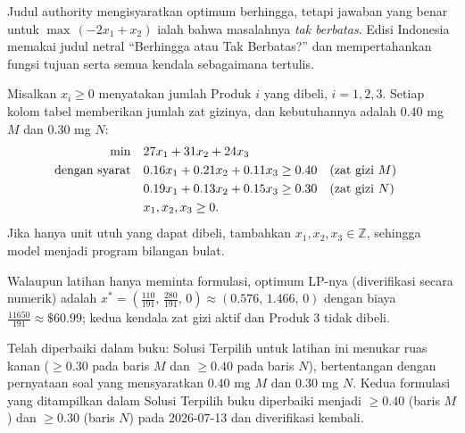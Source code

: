\begin{qaflag}
Judul authority mengisyaratkan optimum berhingga, tetapi jawaban yang benar untuk $\max\,(-2x_1+x_2)$ ialah bahwa masalahnya \emph{tak berbatas}. Edisi Indonesia memakai judul netral ``Berhingga atau Tak Berbatas?'' dan mempertahankan fungsi tujuan serta semua kendala sebagaimana tertulis.
\end{qaflag}

Misalkan $x_i \geq 0$ menyatakan jumlah Produk $i$ yang dibeli, $i = 1, 2, 3$. Setiap kolom tabel memberikan jumlah zat gizinya, dan kebutuhannya adalah $0.40$ mg $M$ dan $0.30$ mg $N$:
\begin{align*}
\min \quad & 27x_1 + 31x_2 + 24x_3 \\
\mbox{dengan syarat}\quad & 0.16x_1 + 0.21x_2 + 0.11x_3 \geq 0.40 && (\mbox{zat gizi } M)\\
& 0.19x_1 + 0.13x_2 + 0.15x_3 \geq 0.30 && (\mbox{zat gizi } N)\\
& x_1, x_2, x_3 \geq 0.
\end{align*}
Jika hanya unit utuh yang dapat dibeli, tambahkan $x_1, x_2, x_3 \in \mathbb{Z}$, sehingga model menjadi program bilangan bulat.

Walaupun latihan hanya meminta formulasi, optimum LP-nya (diverifikasi secara numerik) adalah $x^* = (\tfrac{110}{191},\, \tfrac{280}{191},\, 0) \approx (0.576,\, 1.466,\, 0)$ dengan biaya $\tfrac{11650}{191} \approx \$60.99$; kedua kendala zat gizi aktif dan Produk 3 tidak dibeli.

\begin{qaflag}
Telah diperbaiki dalam buku: Solusi Terpilih untuk latihan ini menukar ruas kanan ($\geq 0.30$ pada baris $M$ dan $\geq 0.40$ pada baris $N$), bertentangan dengan pernyataan soal yang mensyaratkan $0.40$ mg $M$ dan $0.30$ mg $N$. Kedua formulasi yang ditampilkan dalam Solusi Terpilih buku diperbaiki menjadi $\geq 0.40$ (baris $M$) dan $\geq 0.30$ (baris $N$) pada 2026-07-13 dan diverifikasi kembali.
\end{qaflag}


